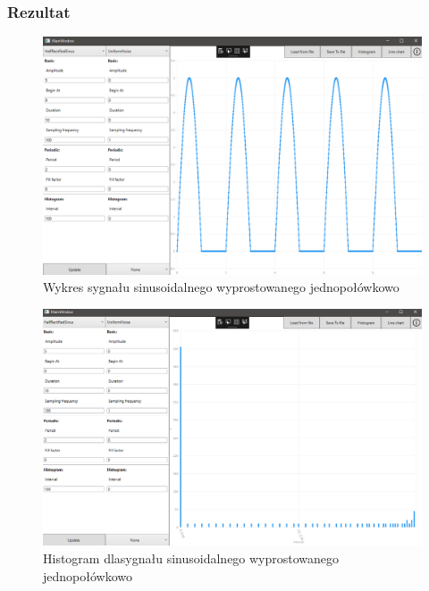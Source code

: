 \documentclass[12pt]{article}
\begin{document}
\subsubsection{Rezultat}

\begin{figure}[H]
 \centering
 \includegraphics[width=14cm]{images/half1.PNG}
 \vspace{-0.3cm}
 \caption{Wykres sygnału sinusoidalnego wyprostowanego jednopołówkowo}
 \label{gui}
\end{figure}

\begin{figure}[H]
 \centering
 \includegraphics[width=14cm]{images/half1hist.PNG}
 \vspace{-0.3cm}
 \caption{Histogram dlasygnału sinusoidalnego wyprostowanego jednopołówkowo}
 \label{gui}
\end{figure}
\end{document}
